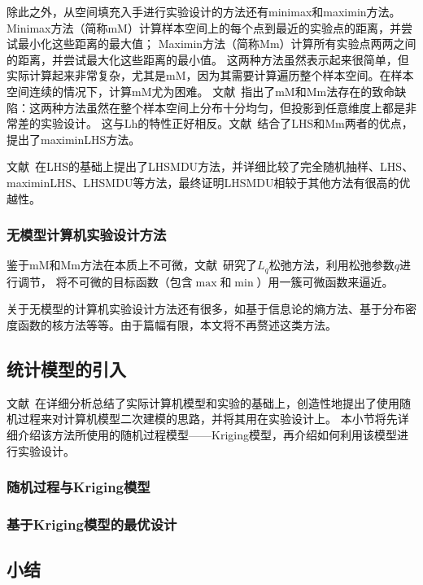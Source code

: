 \documentclass[index]{subfiles}
\begin{document}
除此之外，从空间填充入手进行实验设计的方法还有minimax和maximin方法\cite{johnson1990}。
Minimax方法（简称mM）计算样本空间上的每个点到最近的实验点的距离，并尝试最小化这些距离的最大值；
Maximin方法（简称Mm）计算所有实验点两两之间的距离，并尝试最大化这些距离的最小值。
这两种方法虽然表示起来很简单，但实际计算起来非常复杂，尤其是mM，因为其需要计算遍历整个样本空间。在样本空间连续的情况下，计算mM尤为困难。
文献~指出了mM和Mm法存在的致命缺陷：这两种方法虽然在整个样本空间上分布十分均匀，但投影到任意维度上都是非常差的实验设计。
这与Lh的特性正好相反。文献~结合了LHS和Mm两者的优点，提出了maximinLHS方法。

文献~在LHS的基础上提出了LHSMDU方法，并详细比较了完全随机抽样、LHS、maximinLHS、LHSMDU等方法，最终证明LHSMDU相较于其他方法有很高的优越性。

\subsubsection{无模型计算机实验设计方法}
鉴于mM和Mm方法在本质上不可微，文献~研究了$L_q$松弛方法，利用松弛参数$q$进行调节，
将不可微的目标函数（包含$\max$和$\min$）用一簇可微函数来逼近。

关于无模型的计算机实验设计方法还有很多，如基于信息论的熵方法、基于分布密度函数的核方法等等\cite{pronzato2012}。由于篇幅有限，本文将不再赘述这类方法。

\subsection{统计模型的引入}\label{ssec:doe-gp}
文献~在详细分析总结了实际计算机模型和实验的基础上，创造性地提出了使用随机过程来对计算机模型二次建模的思路，并将其用在实验设计上。
本小节将先详细介绍该方法所使用的随机过程模型——Kriging模型，再介绍如何利用该模型进行实验设计。

\subsubsection{随机过程与Kriging模型}


\subsubsection{基于Kriging模型的最优设计}

\subsection{小结}
\end{document}
